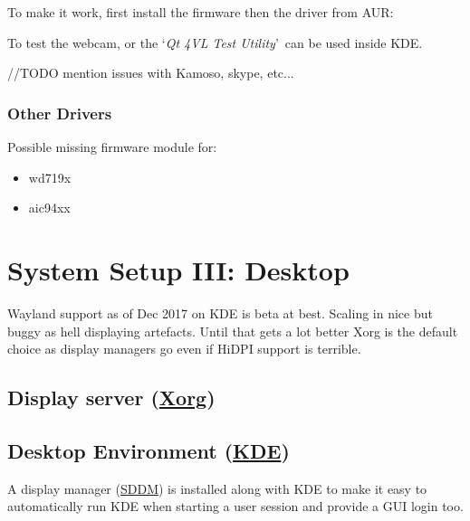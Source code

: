 To make it work, first install the firmware then the driver from AUR:


To test the webcam,  or the \lq \textit{Qt 4VL Test Utility}\rq\ can be used inside KDE.

//TODO mention issues with Kamoso, skype, etc...

\subsubsection{Other Drivers}

Possible missing firmware module for:
\begin{itemize}[noitemsep,topsep=0pt,leftmargin=*]
	\item wd719x
	\item aic94xx
\end{itemize}


\section{System Setup III: Desktop}

Wayland support as of Dec 2017 on KDE is beta at best. Scaling in nice but buggy as hell displaying artefacts. Until that gets a lot better Xorg is the default choice as display managers go even if HiDPI support is terrible. 

\subsection{Display server (\href{https://wiki.archlinux.org/index.php/xorg}{Xorg})}


\subsection{Desktop Environment (\href{https://wiki.archlinux.org/index.php/KDE}{KDE})}

A display manager (\href{https://wiki.archlinux.org/index.php/SDDM}{SDDM}) is installed along with KDE to make it easy to automatically run KDE when starting a user session and provide a GUI login too.


